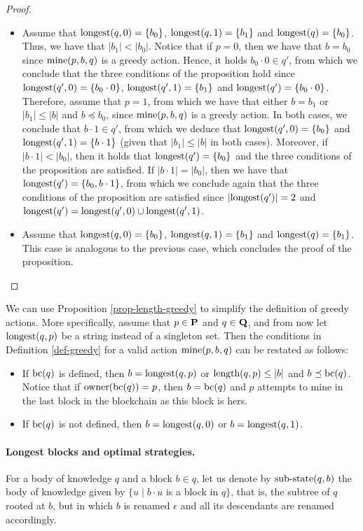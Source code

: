 \begin{proof}
\begin{itemize}
\item Assume that ${\text{\rm longest}}(q,0) = \{b_0\}$,  ${\text{\rm longest}}(q, 1) = \{b_1\}$ and ${\text{\rm longest}}(q) = \{b_0\}$. Thus, we have that $|b_1| < |b_0|$. Notice that if $p =0$, then we have that $b=b_0$ since $\text{\rm mine}(p,b,q)$ is a greedy action. Hence, it holds $b_0 \cdot 0 \in q'$, from which we conclude that the three conditions of the proposition hold since ${\text{\rm longest}}(q',0) = \{b_0 \cdot 0\}$, ${\text{\rm longest}}(q',1) = \{b_1\}$ and ${\text{\rm longest}}(q') = \{b_0 \cdot 0\}$. Therefore, assume that $p = 1$, from which we have that  either $b=b_1$ or $|b_1| \leq |b|$ and $b \preceq b_0$, since $\text{\rm mine}(p,b,q)$ is a greedy action. In both cases, we conclude that $b \cdot 1 \in q'$, from which we deduce that ${\text{\rm longest}}(q',0) = \{b_0\}$ and ${\text{\rm longest}}(q',1) = \{b \cdot 1\}$ (given that $|b_1| \leq |b|$ in both cases). Moreover, if $|b \cdot 1| < |b_0|$, then it holds that ${\text{\rm longest}}(q') = \{b_0\}$ and the three conditions of the proposition are satisfied. If $|b \cdot 1| = |b_0|$, then we have that ${\text{\rm longest}}(q') = \{b_0, b \cdot 1\}$, from which we conclude again that the three conditions of the proposition are satisfied since $|{\text{\rm longest}}(q')| = 2$ and ${\text{\rm longest}}(q') = {\text{\rm longest}}(q',0) \cup {\text{\rm longest}}(q',1)$.

\item Assume that ${\text{\rm longest}}(q,0) = \{b_0\}$,  ${\text{\rm longest}}(q, 1) = \{b_1\}$ and ${\text{\rm longest}}(q) = \{b_1\}$. This case is analogous to the previous case, which concludes the proof of the proposition.
\end{itemize}
\end{proof}
We can use Proposition \ref{prop-length-greedy} to simplify the definition of greedy actions. More specifically, assume that $p \in \mathbf{P}$ and $q \in \mathbf{Q}$, and from now let ${\text{\rm longest}}(q,p)$ be a string instead of a singleton set. Then the conditions in Definition \ref{def-greedy} for a valid action $\text{\rm mine}(p,b,q)$ can be restated as follows:
\begin{itemize}
\item If $\text{bc}(q)$ is defined, then $b = {\text{\rm longest}}(q,p)$ or $\text{\rm length}(q,p) \leq |b|$ and $b \preceq \text{bc}(q)$. Notice that if $\text{\rm owner}(\text{bc}(q)) = p$, then $b = \text{bc}(q)$ and $p$ attempts to mine in the last block in the blockchain as this block is hers. 

\item If $\text{bc}(q)$ is not defined, then $b = {\text{\rm longest}}(q,0)$  or $b = {\text{\rm longest}}(q,1)$. 
\end{itemize}

\paragraph{Longest blocks and optimal strategies.}
For a body of knowledge $q$ and a block $b \in q$, let us denote by ${\text{\rm sub-state}}(q,b)$ the body of knowledge 
given by $\{u \mid b\cdot u$ is a block in $q\}$, that is, the subtree of $q$ rooted at $b$, but in which $b$ is renamed 
$\epsilon$ and all its descendants are renamed accordingly. 

